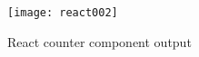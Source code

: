 \begin{figure}
  \centering
  \texttt{[image: react002]}
  \caption{React counter component output}
  \label{fig:reactCounterComponent}
\end{figure}







